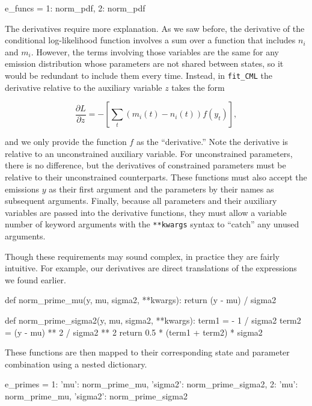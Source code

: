 \begin{NotebookIn}
e_funcs = {1: norm_pdf,
           2: norm_pdf}
\end{NotebookIn}

The derivatives require more explanation. As we saw before, the derivative of the conditional log-likelihood function involves a sum over a function that includes $n_i$ and  $m_i$. However, the terms involving those variables are the same for any emission distribution whose parameters are not shared between states, so it would be redundant to include them every time. Instead, in \texttt{fit\_CML} the derivative relative to the auxiliary variable $z$ takes the form

\begin{equation*}
\frac{\partial L}{\partial z}
= -\left[
         \sum_t \left( m_i(t) - n_i(t) \right)
                f(y_t)
   \right],
\end{equation*}

and we only provide the function $f$ as the ``derivative.'' Note the derivative is relative to an unconstrained auxiliary variable. For unconstrained parameters, there is no difference, but the derivatives of constrained parameters must be relative to their unconstrained counterparts. These functions must also accept the emissions $y$ as their first argument and the parameters by their names as subsequent arguments. Finally, because all parameters and their auxiliary variables are passed into the derivative functions, they must allow a variable number of keyword arguments with the \texttt{**kwargs} syntax to ``catch'' any unused arguments.

Though these requirements may sound complex, in practice they are fairly intuitive. For example, our derivatives are direct translations of the expressions we found earlier.

\begin{NotebookIn}
def norm_prime_mu(y, mu, sigma2, **kwargs):
    return (y - mu) / sigma2


def norm_prime_sigma2(y, mu, sigma2, **kwargs):
    term1 = - 1 / sigma2
    term2 = (y - mu) ** 2 / sigma2 ** 2
    return 0.5 * (term1 + term2) * sigma2
\end{NotebookIn}

These functions are then mapped to their corresponding state and parameter combination using a nested dictionary.

\begin{NotebookIn}
e_primes = {1: {'mu': norm_prime_mu, 'sigma2': norm_prime_sigma2},
            2: {'mu': norm_prime_mu, 'sigma2': norm_prime_sigma2}}
\end{NotebookIn}

